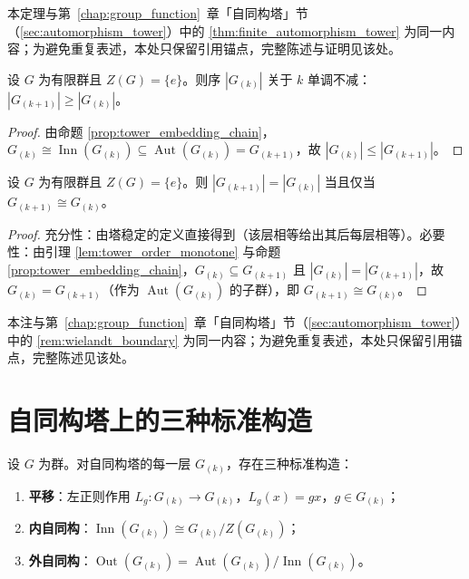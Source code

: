 \begin{theorem}\label{thm:higher_wielandt}
本定理与第~\ref{chap:group_function}~章「自同构塔」节（\cref{sec:automorphism_tower}）中的 \cref{thm:finite_automorphism_tower} 为同一内容；为避免重复表述，本处只保留引用锚点，完整陈述与证明见该处。
\end{theorem}

\begin{lemma}[塔序的单调性]\label{lem:tower_order_monotone}
设 $G$ 为有限群且 $Z(G)=\{e\}$。则序 $|G_{(k)}|$ 关于 $k$ 单调不减：$|G_{(k+1)}|\ge |G_{(k)}|$。
\end{lemma}

\begin{proof}
由命题 \ref{prop:tower_embedding_chain}，$G_{(k)}\cong\operatorname{Inn}(G_{(k)})\subseteq\operatorname{Aut}(G_{(k)})=G_{(k+1)}$，故 $|G_{(k)}|\le |G_{(k+1)}|$。
\end{proof}

\begin{corollary}[等阶即稳定]\label{cor:equal_order_stable}
设 $G$ 为有限群且 $Z(G)=\{e\}$。则 $|G_{(k+1)}|=|G_{(k)}|$ 当且仅当 $G_{(k+1)}\cong G_{(k)}$。
\end{corollary}

\begin{proof}
充分性：由塔稳定的定义直接得到（该层相等给出其后每层相等）。必要性：由引理 \ref{lem:tower_order_monotone} 与命题 \ref{prop:tower_embedding_chain}，$G_{(k)}\subseteq G_{(k+1)}$ 且 $|G_{(k)}|=|G_{(k+1)}|$，故 $G_{(k)}=G_{(k+1)}$（作为 $\operatorname{Aut}(G_{(k)})$ 的子群），即 $G_{(k+1)}\cong G_{(k)}$。
\end{proof}

\begin{remark}\label{rem:higher_wielandt_boundary}
本注与第~\ref{chap:group_function}~章「自同构塔」节（\cref{sec:automorphism_tower}）中的 \cref{rem:wielandt_boundary} 为同一内容；为避免重复表述，本处只保留引用锚点，完整陈述见该处。
\end{remark}

\section{自同构塔上的三种标准构造}
\label{sec:tower_three_constructions}

\begin{proposition}[自同构塔每一层的三种构造]\label{prop:tower_three_operations}
设 $G$ 为群。对自同构塔的每一层 $G_{(k)}$，存在三种标准构造：
\begin{enumerate}[label=(\roman*)]
    \item \textbf{平移}：左正则作用 $L_g: G_{(k)}\to G_{(k)}$，$L_g(x)=gx$，$g\in G_{(k)}$；
    \item \textbf{内自同构}：$\operatorname{Inn}(G_{(k)}) \cong G_{(k)}/Z(G_{(k)})$；
    \item \textbf{外自同构}：$\operatorname{Out}(G_{(k)}) = \operatorname{Aut}(G_{(k)})/\operatorname{Inn}(G_{(k)})$。
\end{enumerate}
\end{proposition}

